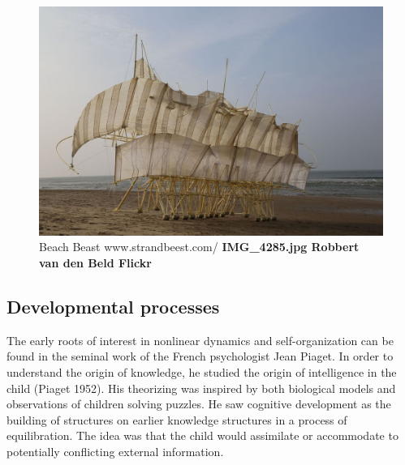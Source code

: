 \documentclass[
  a4paper,
  DIV=11,
  numbers=noendperiod,
  oneside]{scrreprt}
\begin{document}
\begin{figure}

{\centering \includegraphics{media/ch5n/image8b.png}

}

\caption{\label{fig-ch5n-img8-old-46}Beach Beast \textbar{}
www.strandbeest.com/ \textbf{IMG\_4285.jpg \textbar{} Robbert van den
Beld \textbar{} Flickr}}

\end{figure}

\hypertarget{sec-Developmental-processes}{%
\subsection{Developmental processes}\label{sec-Developmental-processes}}

The early roots of interest in nonlinear dynamics and self-organization
can be found in the seminal work of the French psychologist Jean Piaget.
In order to understand the origin of knowledge, he studied the origin of
intelligence in the child (Piaget 1952). His theorizing was inspired by
both biological models and observations of children solving puzzles. He
saw cognitive development as the building of structures on earlier
knowledge structures in a process of equilibration. The idea was that
the child would assimilate or accommodate to potentially conflicting
external information.
\end{document}
